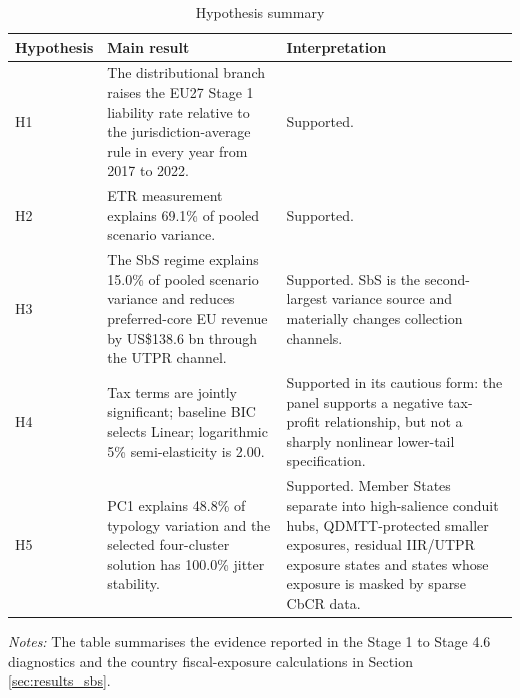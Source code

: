 \begin{table}[H]
\centering
\small
\caption[Hypothesis summary]{Hypothesis summary}
\label{tab:hypothesis_result_summary}
\begin{tabular}{@{}L{1.7cm}L{7.1cm}L{4.8cm}@{}}
\toprule
Hypothesis & Main result & Interpretation \\
\midrule
H1 & The distributional branch raises the EU27 Stage 1 liability rate relative to the jurisdiction-average rule in every year from 2017 to 2022. & Supported. \\
H2 & ETR measurement explains 69.1\% of pooled scenario variance. & Supported. \\
H3 & The SbS regime explains 15.0\% of pooled scenario variance and reduces preferred-core EU revenue by US\$138.6 bn through the UTPR channel. & Supported. SbS is the second-largest variance source and materially changes collection channels. \\
H4 & Tax terms are jointly significant; baseline BIC selects Linear; logarithmic 5\% semi-elasticity is 2.00. & Supported in its cautious form: the panel supports a negative tax-profit relationship, but not a sharply nonlinear lower-tail specification. \\
H5 & PC1 explains 48.8\% of typology variation and the selected four-cluster solution has 100.0\% jitter stability. & Supported. Member States separate into high-salience conduit hubs, QDMTT-protected smaller exposures, residual IIR/UTPR exposure states and states whose exposure is masked by sparse CbCR data. \\
\bottomrule
\end{tabular}

\vspace{0.5em}
\begin{minipage}{0.96\textwidth}
\footnotesize\raggedright \textit{Notes:} The table summarises the evidence reported in the Stage 1 to Stage 4.6 diagnostics and the country fiscal-exposure calculations in Section \ref{sec:results_sbs}.
\end{minipage}
\end{table}
